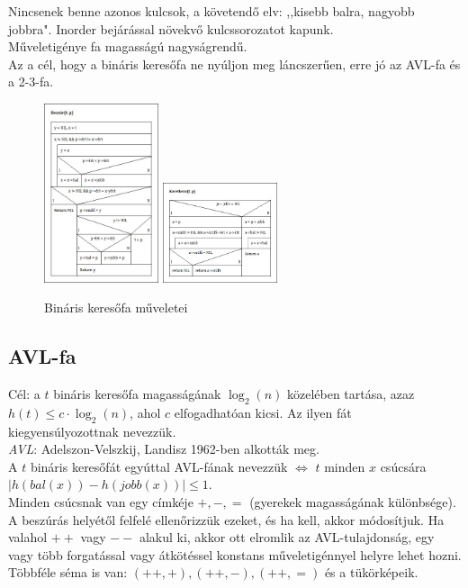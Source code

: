 \documentclass[margin=0px]{article}
\begin{document}
	Nincsenek benne azonos kulcsok, a követendő elv: ,,kisebb balra, nagyobb jobbra". Inorder bejárással növekvő kulcssorozatot kapunk. \\
	Műveletigénye fa magasságú nagyságrendű. \\
	Az a cél, hogy a bináris keresőfa ne nyúljon meg láncszerűen, erre jó az AVL-fa és a 2-3-fa.
	\begin{figure}[H]
		\centering
		\includegraphics[width=0.3\textwidth]{img/Beszur.jpg}
		\includegraphics[width=0.3\textwidth]{img/Kovetkezo.jpg}
		\caption{Bináris keresőfa műveletei}
	\end{figure}
	
	\subsection{AVL-fa}
	
	Cél: a $t$ bináris keresőfa magasságának $\log_2(n)$ közelében tartása, azaz $h(t) \leq c \cdot \log_2(n)$, ahol $c$ elfogadhatóan kicsi. Az ilyen fát kiegyensúlyozottnak nevezzük. \\
	\textit{AVL}: Adelszon-Velszkij, Landisz 1962-ben alkották meg. \\
	A $t$ bináris keresőfát egyúttal AVL-fának nevezzük $\iff$ $t$ minden $x$ csúcsára $|h(bal(x))-h(jobb(x))| \leq 1$. \\
	Minden csúcsnak van egy címkéje $+,-,=$ (gyerekek magasságának különbsége). A beszúrás helyétől felfelé ellenőrizzük ezeket, és ha kell, akkor módosítjuk. Ha valahol $++$ vagy $--$ alakul ki, akkor ott elromlik az AVL-tulajdonság, egy vagy több forgatással vagy átkötéssel konstans műveletigénnyel helyre lehet hozni. \\
	Többféle séma is van: $(++,+), (++,-), (++,=)$ és a tükörképeik.
	
\end{document}
